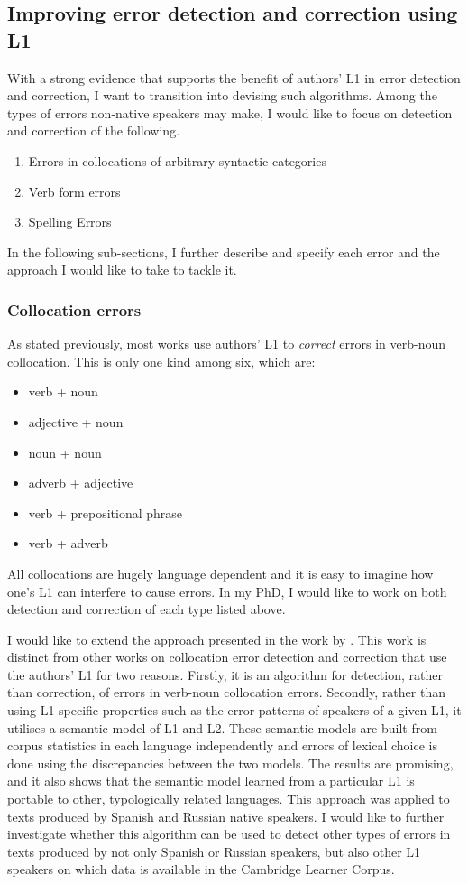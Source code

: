 \documentclass[11pt]{article}
\begin{document}
\subsection{Improving error detection and correction using L1}
With a strong evidence that supports the benefit of authors' L1 in error detection and correction, I want to transition into devising such algorithms.
Among the types of errors non-native speakers may make, I would like to focus on detection and correction of the following.
\begin{enumerate}
\item Errors in collocations of arbitrary syntactic categories\label{error:1}
\item Verb form errors \label{error:2}
\item Spelling Errors \label{error:3}
\end{enumerate}
In the following sub-sections, I further describe and specify each error and the approach I would like to take to tackle it.
\subsubsection{Collocation errors}
\label{subsub:collocation}
As stated previously, most works use authors' L1 to \emph{correct} errors in verb-noun collocation. This is only one kind among six, which are:
\begin{itemize}
\item verb + noun
\item adjective + noun
\item noun + noun
\item adverb + adjective
\item verb + prepositional phrase
\item verb + adverb
\end{itemize}
All collocations are hugely language dependent and it is easy to imagine how one's L1 can interfere to cause errors. In my PhD, I would like to work on both detection and correction of each type listed above.

I would like to extend the approach presented in the work by \cite{kochmarcross}.  This work is distinct from other works on collocation error detection and correction that use the authors’ L1 for two reasons. Firstly, it is an algorithm for detection, rather than correction, of errors in verb-noun collocation errors. Secondly, rather than using L1-specific properties such as the error patterns of speakers of a given L1, it utilises a semantic model of L1 and L2. These semantic models are built from corpus statistics in each language independently and errors of lexical choice is done using the discrepancies between the two models. The results are promising, and it also shows that the semantic model learned from a particular L1 is portable to other, typologically related languages. This approach was applied to texts produced by Spanish and Russian native speakers. I would like to further investigate whether this algorithm can be used to detect other types of errors in texts produced by not only Spanish or Russian speakers, but also other L1 speakers on which data is available in the Cambridge Learner Corpus.
					
\end{document}

